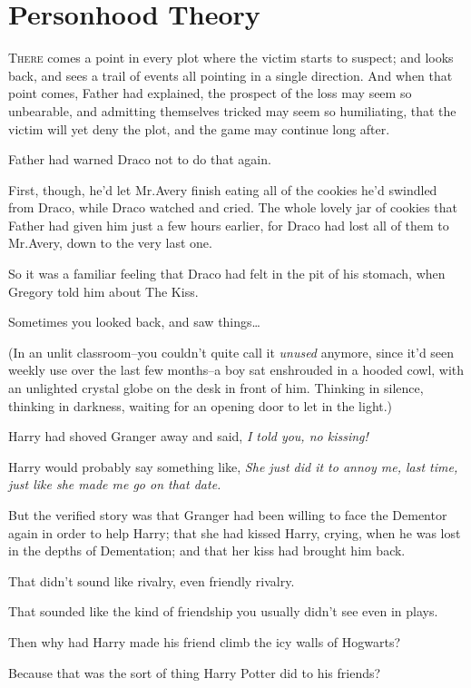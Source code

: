 \chapter{Personhood Theory}

\lettrine{T}{here} comes a point in every plot where the victim starts to suspect; and looks back, and sees a trail of events all pointing in a single direction. And when that point comes, Father had explained, the prospect of the loss may seem so unbearable, and admitting themselves tricked may seem so humiliating, that the victim will yet deny the plot, and the game may continue long after.

Father had warned Draco not to do that again.

First, though, he'd let Mr.\?Avery finish eating all of the cookies he'd swindled from Draco, while Draco watched and cried. The whole lovely jar of cookies that Father had given him just a few hours earlier, for Draco had lost all of them to Mr.\?Avery, down to the very last one.

So it was a familiar feeling that Draco had felt in the pit of his stomach, when Gregory told him about The Kiss.

Sometimes you looked back, and saw things{\ldots}

(In an unlit classroom\---you couldn't quite call it \emph{unused} anymore, since it'd seen weekly use over the last few months\---a boy sat enshrouded in a hooded cowl, with an unlighted crystal globe on the desk in front of him. Thinking in silence, thinking in darkness, waiting for an opening door to let in the light.)

Harry had shoved Granger away and said, \emph{I told you, no kissing!}

Harry would probably say something like, \emph{She just did it to annoy me, last time, just like she made me go on that date.}

But the verified story was that Granger had been willing to face the Dementor again in order to help Harry; that she had kissed Harry, crying, when he was lost in the depths of Dementation; and that her kiss had brought him back.

That didn't sound like rivalry, even friendly rivalry.

That sounded like the kind of friendship you usually didn't see even in plays.

Then why had Harry made his friend climb the icy walls of Hogwarts?

Because that was the sort of thing Harry Potter did to his friends?

